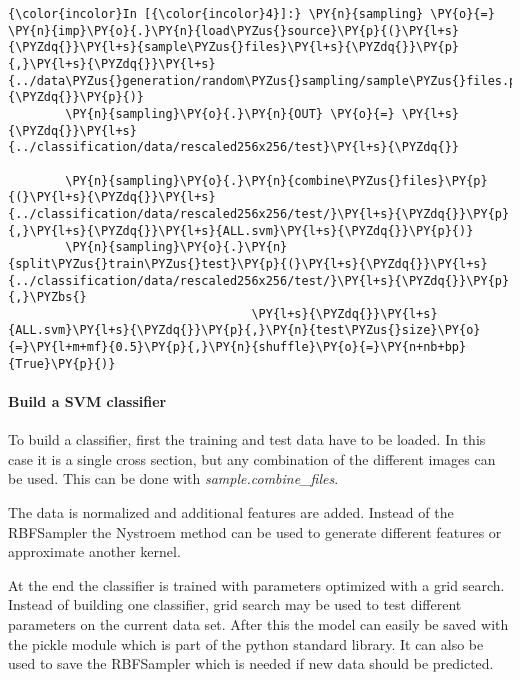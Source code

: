     \begin{Verbatim}[commandchars=\\\{\}]
{\color{incolor}In [{\color{incolor}4}]:} \PY{n}{sampling} \PY{o}{=} \PY{n}{imp}\PY{o}{.}\PY{n}{load\PYZus{}source}\PY{p}{(}\PY{l+s}{\PYZdq{}}\PY{l+s}{sample\PYZus{}files}\PY{l+s}{\PYZdq{}}\PY{p}{,}\PY{l+s}{\PYZdq{}}\PY{l+s}{../data\PYZus{}generation/random\PYZus{}sampling/sample\PYZus{}files.py}\PY{l+s}{\PYZdq{}}\PY{p}{)}
        \PY{n}{sampling}\PY{o}{.}\PY{n}{OUT} \PY{o}{=} \PY{l+s}{\PYZdq{}}\PY{l+s}{../classification/data/rescaled256x256/test}\PY{l+s}{\PYZdq{}}
        
        \PY{n}{sampling}\PY{o}{.}\PY{n}{combine\PYZus{}files}\PY{p}{(}\PY{l+s}{\PYZdq{}}\PY{l+s}{../classification/data/rescaled256x256/test/}\PY{l+s}{\PYZdq{}}\PY{p}{,}\PY{l+s}{\PYZdq{}}\PY{l+s}{ALL.svm}\PY{l+s}{\PYZdq{}}\PY{p}{)}
        \PY{n}{sampling}\PY{o}{.}\PY{n}{split\PYZus{}train\PYZus{}test}\PY{p}{(}\PY{l+s}{\PYZdq{}}\PY{l+s}{../classification/data/rescaled256x256/test/}\PY{l+s}{\PYZdq{}}\PY{p}{,}\PYZbs{}
                                  \PY{l+s}{\PYZdq{}}\PY{l+s}{ALL.svm}\PY{l+s}{\PYZdq{}}\PY{p}{,}\PY{n}{test\PYZus{}size}\PY{o}{=}\PY{l+m+mf}{0.5}\PY{p}{,}\PY{n}{shuffle}\PY{o}{=}\PY{n+nb+bp}{True}\PY{p}{)}
\end{Verbatim}


    \paragraph{Build a SVM classifier}


    To build a classifier, first the training and test data have to be
loaded. In this case it is a single cross section, but any combination
of the different images can be used. This can be done with
\emph{sample.combine\_files}.

The data is normalized and additional features are added. Instead of the
RBFSampler the Nystroem method can be used to generate different
features or approximate another kernel.

At the end the classifier is trained with parameters optimized with a
grid search. Instead of building one classifier, grid search may be used
to test different parameters on the current data set. After this the
model can easily be saved with the pickle module which is part of the
python standard library. It can also be used to save the RBFSampler
which is needed if new data should be predicted.

